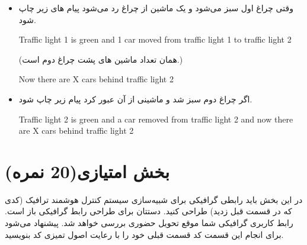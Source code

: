 \documentclass[]{article}
\begin{document}
\begin{itemize}
\item
وقتی چراغ اول سبز می‌شود و یک ماشین از چراغ رد می‌شود پیام های زیر چاپ شود.
\begin{tcolorbox}[boxrule=0pt]
	\begin{latin}
		\large{
			Traffic light 1 is green and 1 car moved from traffic light 1 to 
			traffic light 2
		}
	\end{latin}
\end{tcolorbox}
(همان تعداد ماشین های پشت چراغ دوم است.)
\begin{tcolorbox}[boxrule=0pt]
	\begin{latin}
		\large{
			Now there are X cars behind traffic light 2
		}
	\end{latin}
\end{tcolorbox}

\item
اگر چراغ دوم سبز شد و ماشینی از آن عبور کرد پیام زیر چاپ شود.
\begin{tcolorbox}[boxrule=0pt]
	\begin{latin}
		\large{
			Traffic light 2 is green and a car removed from traffic light 2 and 
			now there are X cars behind traffic light 2
		}
	\end{latin}
\end{tcolorbox}
\end{itemize}

\newpage

\section{بخش امتیازی(20 نمره)}
در این بخش باید رابطی گرافیکی برای شبیه‌سازی سیستم کنترل هوشمند ترافیک (کدی 
که در قسمت قبل زدید) طراحی کنید. دستتان برای طراحی رابط گرافیکی باز است. 
رابط کاربری گرافیکی شما موقع تحویل حضوری بررسی خواهد شد. پیشنهاد می‌شود برای 
انجام این قسمت کد قسمت قبلی خود را با رعایت اصول تمیزی کد بنویسید. 
\end{document}
